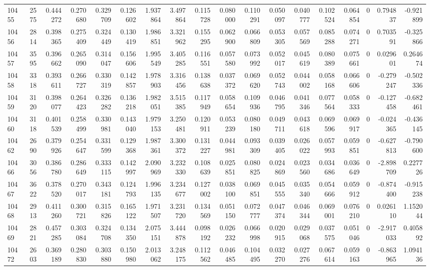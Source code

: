 \begin{tabular}{lrrrrrrrrrrrrrrrrr}
10455 & 2575 & 0.444272 & 0.270680 & 0.329709 & 0.126602 & 1.937864 & 3.497864 & 0.115728 & 0.080000 & 0.110291 & 0.050097 & 0.040777 & 0.102524 & 0.064854 & 0 & 0.794837 & -0.921899 \\
10456 & 2814 & 0.398365 & 0.275409 & 0.324449 & 0.130419 & 1.986851 & 3.321962 & 0.155295 & 0.062900 & 0.066809 & 0.053305 & 0.057569 & 0.085288 & 0.074271 & 0 & 0.703591 & -0.325866 \\
10457 & 3595 & 0.396662 & 0.265090 & 0.314047 & 0.156606 & 1.995549 & 3.405285 & 0.116551 & 0.057580 & 0.073992 & 0.052017 & 0.045619 & 0.080389 & 0.075661 & 0 & 0.029601 & 0.264674 \\
10458 & 3318 & 0.393611 & 0.266727 & 0.330319 & 0.142857 & 1.978903 & 3.316456 & 0.138638 & 0.037372 & 0.069620 & 0.052743 & 0.044002 & 0.058168 & 0.066606 & 0 & -0.279247 & -0.502336 \\
10459 & 3120 & 0.398077 & 0.264423 & 0.326282 & 0.136218 & 1.982051 & 3.515385 & 0.117949 & 0.058654 & 0.109936 & 0.046795 & 0.041346 & 0.077564 & 0.058333 & 0 & -0.127458 & -0.682461 \\
10460 & 3118 & 0.401539 & 0.258499 & 0.330981 & 0.143040 & 1.979153 & 3.250481 & 0.120911 & 0.053239 & 0.080180 & 0.049711 & 0.043618 & 0.069596 & 0.069917 & 0 & -0.024365 & -0.436145 \\
10462 & 2690 & 0.379926 & 0.254647 & 0.331599 & 0.129368 & 1.987361 & 3.300372 & 0.131227 & 0.044981 & 0.093309 & 0.039405 & 0.026022 & 0.057993 & 0.059851 & 0 & -0.627813 & -0.790600 \\
10466 & 3056 & 0.386780 & 0.286649 & 0.333115 & 0.142997 & 2.090969 & 3.232330 & 0.108639 & 0.025851 & 0.080825 & 0.024869 & 0.023560 & 0.034686 & 0.036649 & 0 & -2.898709 & 0.227726 \\
10467 & 3622 & 0.378520 & 0.270017 & 0.343181 & 0.124793 & 1.996135 & 3.234677 & 0.127002 & 0.038100 & 0.069851 & 0.045555 & 0.035340 & 0.054666 & 0.059912 & 0 & -0.874400 & -0.915238 \\
10468 & 2913 & 0.411260 & 0.300721 & 0.315826 & 0.165122 & 1.971507 & 3.231720 & 0.134569 & 0.051150 & 0.072777 & 0.047374 & 0.046344 & 0.069001 & 0.076210 & 0 & 0.026110 & 1.152044 \\
10469 & 2821 & 0.457285 & 0.303084 & 0.324708 & 0.134350 & 2.075151 & 3.444878 & 0.098192 & 0.026232 & 0.066998 & 0.020915 & 0.029068 & 0.037575 & 0.051046 & 0 & -2.917033 & 0.405892 \\
10472 & 2603 & 0.369189 & 0.280830 & 0.303880 & 0.150980 & 2.013062 & 3.248175 & 0.112562 & 0.046485 & 0.104495 & 0.032270 & 0.027276 & 0.067614 & 0.059163 & 0 & -0.863965 & 1.094136 \\

\end{tabular}
